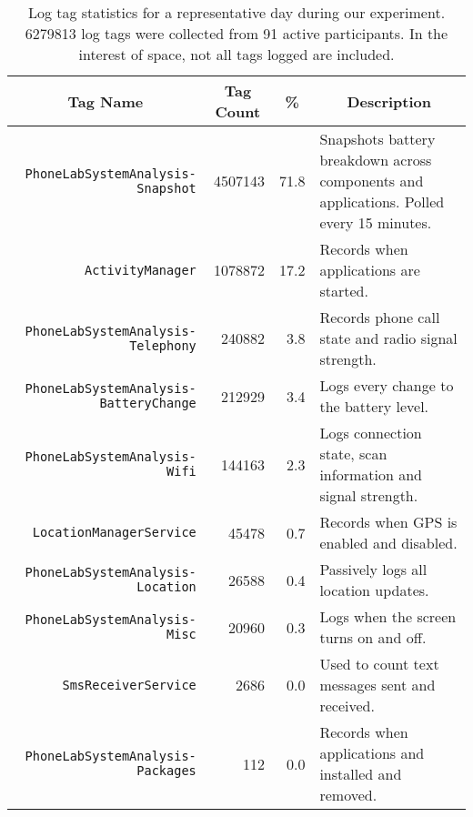 \begin{table*}[t]
\begin{threeparttable}
{\small
\begin{tabularx}{\textwidth}{rrrX}
\multicolumn{1}{c}{\normalsize{\textbf{Tag Name}}} & 
\multicolumn{1}{c}{\normalsize{\textbf{Tag Count}}} & 
\multicolumn{1}{c}{\normalsize{\textbf{\%}}} & 
\multicolumn{1}{c}{\normalsize{\textbf{Description}}} \\
\toprule
\texttt{PhoneLabSystemAnalysis-Snapshot} & \num{4507143} & 71.8 & Snapshots battery breakdown across components and applications. Polled every 15 minutes. \\
\texttt{ActivityManager} & \num{1078872} & 17.2 & Records when applications are started. \\
\texttt{PhoneLabSystemAnalysis-Telephony} & \num{240882} & 3.8 & Records phone call state and radio signal strength. \\
\texttt{PhoneLabSystemAnalysis-BatteryChange} & \num{212929} & 3.4 & Logs every change to the battery level. \\
\texttt{PhoneLabSystemAnalysis-Wifi} & \num{144163} & 2.3 & Logs connection state, scan information and signal strength. \\
\texttt{LocationManagerService} & \num{45478} & 0.7 & Records when GPS is enabled and disabled. \\
\texttt{PhoneLabSystemAnalysis-Location} & \num{26588} & 0.4 & Passively logs all location updates. \\
\texttt{PhoneLabSystemAnalysis-Misc} & \num{20960} & 0.3 & Logs when the screen turns on and off. \\
\texttt{SmsReceiverService} & \num{2686} & 0.0 & Used to count text messages sent and received. \\
\texttt{PhoneLabSystemAnalysis-Packages} & \num{112} & 0.0 & Records when applications and installed and removed. \\
\end{tabularx}
}
\caption{Log tag statistics for a representative day during our experiment. \textnormal{\num{6279813} log tags
were collected from 91 active participants. In the interest of space, not all tags logged are included.}}
\end{threeparttable}
\end{table*}
